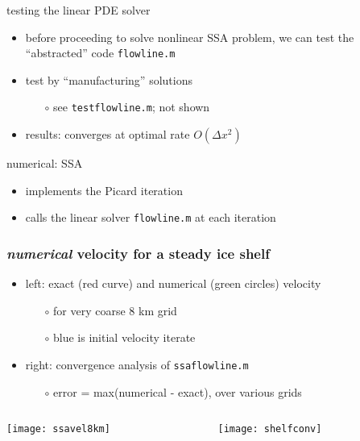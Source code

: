 \begin{frame}{testing the linear PDE solver}

\begin{itemize}
\item before proceeding to solve nonlinear SSA problem, we can test the ``abstracted'' code \texttt{flowline.m}
\item test by ``manufacturing'' solutions
  \begin{itemize}
  \item[$\circ$] see \texttt{testflowline.m}; not shown
  \end{itemize}
\item results:  converges at optimal rate $O(\Delta x^2)$
\end{itemize}
\end{frame}


\begin{frame}{numerical: SSA}

\vspace{-3mm}

\vspace{-5mm}
\small
\begin{itemize}
\item implements the Picard iteration
\item calls the linear solver \texttt{flowline.m} at each iteration
\end{itemize}
\end{frame}


\begin{frame}[fragile]
  \frametitle{\emph{numerical} velocity for a steady ice shelf}

\begin{itemize}
\item left: exact (red curve) and numerical (green circles) velocity
  \begin{itemize}
  \item[$\circ$] for very coarse 8 km grid
  \item[$\circ$] blue is initial velocity iterate
  \end{itemize}
\item right: convergence analysis of \texttt{ssaflowline.m}
  \begin{itemize}
  \item[$\circ$] error = max(numerical - exact), over various grids
  \end{itemize}
\end{itemize}

\begin{columns}
\begin{column}{0.5\textwidth}
  \texttt{[image: ssavel8km]}
\end{column}
\begin{column}{0.5\textwidth}
  \texttt{[image: shelfconv]}
\end{column}
\end{columns}

\end{frame}



